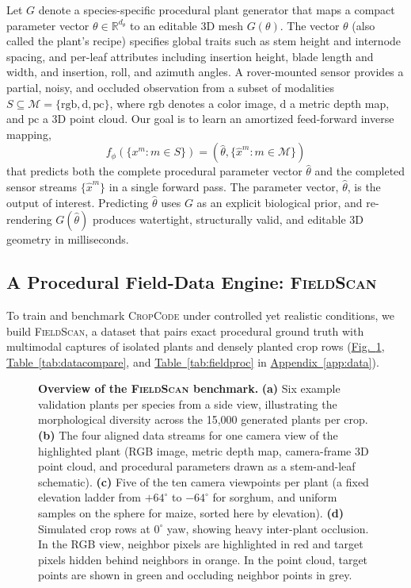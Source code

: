 \documentclass[10pt,twocolumn,letterpaper]{article}
\newcommand{\figref}[1]{\hyperref[#1]{Fig.~\ref*{#1}}}
\newcommand{\tabref}[1]{\hyperref[#1]{Table~\ref*{#1}}}
\newcommand{\appendixref}[1]{\hyperref[#1]{Appendix~\ref*{#1}}}
\newcommand{\method}{\textup{\textsc{CropCode}}}   %
\newcommand{\dataset}{\textup{\textsc{FieldScan}}}
\providecommand{\R}{\mathbb{R}}
\begin{document}
Let $G$ denote a species-specific procedural plant generator that maps a compact parameter vector $\theta \in \R^{d_\theta}$ to an editable 3D mesh $G(\theta)$. The vector $\theta$ (also called the plant's recipe) specifies global traits such as stem height and internode spacing, and per-leaf attributes including insertion height, blade length and width, and insertion, roll, and azimuth angles. A rover-mounted sensor provides a partial, noisy, and occluded observation from a subset of modalities $S \subseteq \mathcal{M} = \{\mathrm{rgb}, \mathrm{d}, \mathrm{pc}\}$, where $\mathrm{rgb}$ denotes a color image, $\mathrm{d}$ a metric depth map, and $\mathrm{pc}$ a 3D point cloud. Our goal is to learn an amortized feed-forward inverse mapping,
\begin{equation}
  f_\phi\!\left(\{x^m : m \in S\}\right)
  = \left(\hat\theta, \{\hat x^m : m \in \mathcal{M}\}\right)
  \label{eq:procedural-inverse}
\end{equation}
that predicts both the complete procedural parameter vector $\hat\theta$ and the completed sensor streams $\{\hat x^m\}$ in a single forward pass. The parameter vector, $\hat\theta$, is the output of interest. Predicting $\hat\theta$ uses $G$ as an explicit biological prior, and re-rendering $G(\hat\theta)$ produces watertight, structurally valid, and editable 3D geometry in milliseconds.

\subsection{A Procedural Field-Data Engine: \dataset{}}
\label{sec:method-data}

To train and benchmark \method{} under controlled yet realistic conditions, we build \dataset{}, a dataset that pairs exact procedural ground truth with multimodal captures of isolated plants and densely planted crop rows (\figref{fig:dataset}, \tabref{tab:datacompare}, and \tabref{tab:fieldproc} in \appendixref{app:data}).

\begin{figure}[t]
  \centering
  \resizebox{\linewidth}{!}{}
  \caption{\textbf{Overview of the \dataset{} benchmark.} \textbf{(a)} Six example validation plants per species from a side view, illustrating the morphological diversity across the 15{,}000 generated plants per crop. \textbf{(b)} The four aligned data streams for one camera view of the highlighted plant (RGB image, metric depth map, camera-frame 3D point cloud, and procedural parameters drawn as a stem-and-leaf schematic). \textbf{(c)} Five of the ten camera viewpoints per plant (a fixed elevation ladder from $+64^\circ$ to $-64^\circ$ for sorghum, and uniform samples on the sphere for maize, sorted here by elevation). \textbf{(d)} Simulated crop rows at $0^\circ$ yaw, showing heavy inter-plant occlusion. In the RGB view, neighbor pixels are highlighted in red and target pixels hidden behind neighbors in orange. In the point cloud, target points are shown in green and occluding neighbor points in grey.}
  \label{fig:dataset}
\end{figure}
\end{document}
